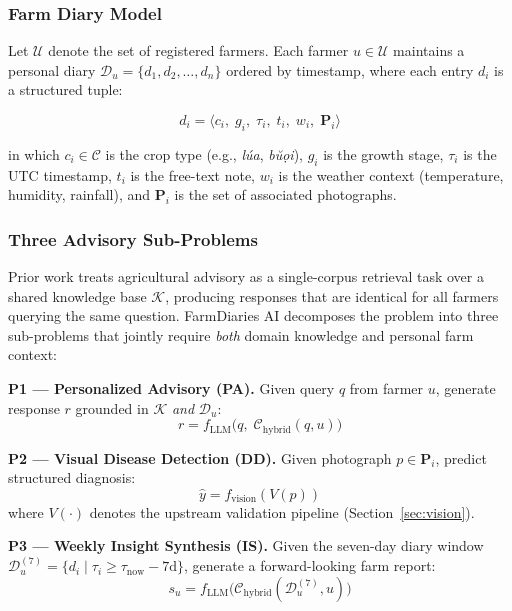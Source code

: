 \documentclass[conference]{IEEEtran}
\begin{document}
\subsubsection{Farm Diary Model}

Let $\mathcal{U}$ denote the set of registered farmers. Each farmer
$u \in \mathcal{U}$ maintains a personal diary
$\mathcal{D}_u = \{d_1, d_2, \ldots, d_n\}$ ordered by timestamp,
where each entry $d_i$ is a structured tuple:

\begin{equation}
  d_i = \langle c_i,\; g_i,\; \tau_i,\; t_i,\; w_i,\; \mathbf{P}_i \rangle
\end{equation}

\noindent in which $c_i \in \mathcal{C}$ is the crop type
(e.g., \textit{l\'{u}a}, \textit{b\u{u}\d{o}i}), $g_i$ is the growth
stage, $\tau_i$ is the UTC timestamp, $t_i$ is the free-text note,
$w_i$ is the weather context (temperature, humidity, rainfall), and
$\mathbf{P}_i$ is the set of associated photographs.

\subsubsection{Three Advisory Sub-Problems}

Prior work \cite{lewis2020,shizishan2024} treats agricultural advisory as a
single-corpus retrieval task over a shared knowledge base $\mathcal{K}$,
producing responses that are identical for all farmers querying the same
question. FarmDiaries AI decomposes the problem into three sub-problems
that jointly require \emph{both} domain knowledge and personal farm
context:

\textbf{P1 --- Personalized Advisory (PA).}
Given query $q$ from farmer $u$, generate response $r$ grounded in
$\mathcal{K}$ \emph{and} $\mathcal{D}_u$:
\begin{equation}
  r = f_{\mathrm{LLM}}\!\bigl(q,\;\mathcal{C}_{\mathrm{hybrid}}(q,u)\bigr)
  \label{eq:pa}
\end{equation}

\textbf{P2 --- Visual Disease Detection (DD).}
Given photograph $p \in \mathbf{P}_i$, predict structured diagnosis:
\begin{equation}
  \hat{y} = f_{\mathrm{vision}}(V(p))
  \label{eq:dd}
\end{equation}
where $V(\cdot)$ denotes the upstream validation pipeline
(Section~\ref{sec:vision}).

\textbf{P3 --- Weekly Insight Synthesis (IS).}
Given the seven-day diary window
$\mathcal{D}_u^{(7)} = \{d_i \mid \tau_i \ge \tau_{\mathrm{now}} - 7\mathrm{d}\}$,
generate a forward-looking farm report:
\begin{equation}
  s_u = f_{\mathrm{LLM}}\!\bigl(\mathcal{C}_{\mathrm{hybrid}}
  (\mathcal{D}_u^{(7)}, u)\bigr)
  \label{eq:is}
\end{equation}
\end{document}
